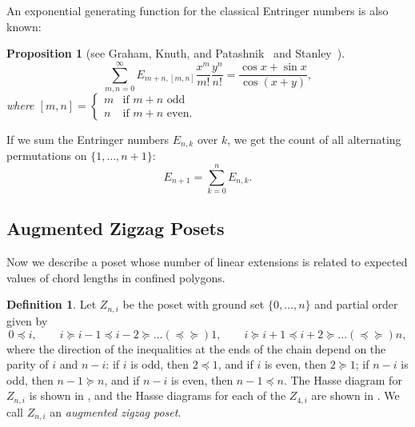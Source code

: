\documentclass{article}
\newtheorem{proposition}[theorem]{Proposition}
\theoremstyle{definition}
\newtheorem{definition}[theorem]{Definition}
\newcommand{\ent}[2]{E_{#1,#2}}
\begin{document}
An exponential generating function for the classical Entringer numbers is also known:

\begin{proposition}[{see Graham, Knuth, and Patashnik~\cite[Exercise~6.75]{grahamConcreteMathematicsFoundation1994} and Stanley~\cite[(2.2)]{stanleySurveyAlternatingPermutations2010}}]\label{prop:entringer egf}
	\[
		\sum_{m,n = 0}^\infty E_{m+n,[m,n]} \frac{x^m}{m!}\frac{y^n}{n!}= \frac{\cos x + \sin x}{\cos(x+y)},
	\]
	where 
	$[m,n] = \begin{cases} m & \text{if } m+n \text{ odd} \\ n & \text{if } m+n \text{ even.} \end{cases}$
\end{proposition}

If we sum the Entringer numbers $\ent{n}{k}$ over $k$, we get the count of all alternating permutations on $\{1,\dots , n+1\}$: 
\begin{equation}\label{eq:Entringer sum}
	E_{n+1} = \sum_{k=0}^n \ent{n}{k}.
\end{equation}

\subsection{Augmented Zigzag Posets} 
\label{sub:augmented zigzag posets}

Now we describe a poset whose number of linear extensions is related to expected values of chord lengths in confined polygons.

\begin{definition}\label{def:augmented zigzag}
	Let $Z_{n,i}$ be the poset with ground set $\{0,\dots , n\}$ and partial order given by
	\[
		0 \preceq i, \qquad i \succeq i-1 \preceq i-2 \succeq \dots (\preceq \succeq) 1, \qquad i \succeq i+1 \preceq i+2 \succeq \dots (\preceq \succeq) n,
	\]
	where the direction of the inequalities at the ends of the chain depend on the parity of $i$ and $n-i$: if $i$ is odd, then $2 \preceq 1$, and if $i$ is even, then $2 \succeq 1$; if $n-i$ is odd, then $n-1 \succeq n$, and if $n-i$ is even, then $n-1 \preceq n$. The Hasse diagram for $Z_{n,i}$ is shown in , and the Hasse diagrams for each of the $Z_{4,i}$ are shown in . We call $Z_{n,i}$ an \emph{augmented zigzag poset}.
\end{definition}
\end{document}
